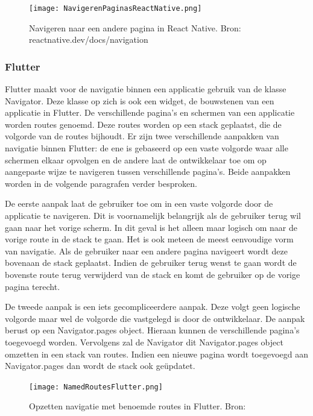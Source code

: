 \begin{figure}
    \texttt{[image: NavigerenPaginasReactNative.png]}
    \caption{Navigeren naar een andere pagina in React Native. Bron:
        reactnative.dev/docs/navigation}
    \label{fig:navigerenReactNative}
\end{figure}

\subsubsection{Flutter}
\label{subsubsec:navigatieFlutter}

Flutter maakt voor de navigatie binnen een applicatie gebruik van de klasse
Navigator. Deze klasse op zich is ook een widget, de bouwstenen van een
applicatie in Flutter. De verschillende pagina's en schermen van een applicatie
worden routes genoemd. Deze routes worden op een stack geplaatst, die de
volgorde van de routes bijhoudt. Er zijn twee verschillende aanpakken van
navigatie binnen Flutter: de ene is gebaseerd op een vaste volgorde waar alle
schermen elkaar opvolgen en de andere laat de ontwikkelaar toe om op aangepaste
wijze te navigeren tussen verschillende pagina's. Beide aanpakken worden in de
volgende paragrafen verder besproken. 

De eerste aanpak laat de gebruiker toe om in een vaste volgorde door de
applicatie te navigeren. Dit is voornamelijk belangrijk als de gebruiker terug
wil gaan naar het vorige scherm. In dit geval is het alleen maar logisch om naar
de vorige route in de stack te gaan. Het is ook meteen de meest eenvoudige vorm
van navigatie. Als de gebruiker naar een andere pagina navigeert wordt deze
bovenaan de stack geplaatst. Indien de gebruiker terug wenst te gaan wordt de
bovenste route terug verwijderd van de stack en komt de gebruiker op de vorige
pagina terecht.

De tweede aanpak is een iets gecompliceerdere aanpak. Deze volgt geen logische
volgorde maar wel de volgorde die vastgelegd is door de ontwikkelaar. De aanpak
berust op een Navigator.pages object. Hieraan kunnen de verschillende pagina's
toegevoegd worden. Vervolgens zal de Navigator dit Navigator.pages object
omzetten in een stack van routes. Indien een nieuwe pagina wordt toegevoegd aan
Navigator.pages dan wordt de stack ook geüpdatet. 

\begin{figure}
    \texttt{[image: NamedRoutesFlutter.png]}
    \caption{Opzetten navigatie met benoemde routes in Flutter. Bron:
        \textcite{Flutter.dev2020}}
    \label{fig:namedRoutesFlutter}
\end{figure}

